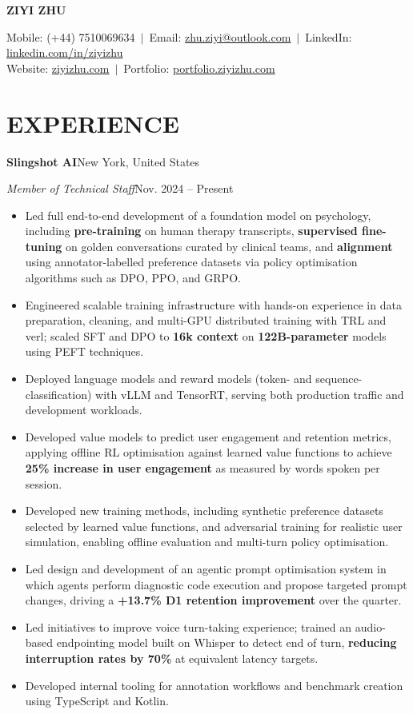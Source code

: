 \documentclass[10pt,a4paper]{article}
\newcommand{\name}[1]{\begin{center}\textbf{\Large #1}\end{center}}
\newcommand{\contactinfo}[4]{
    \begin{center}
    Mobile: #1 $\,\vert\,$ Email: \href{mailto:#2}{#2} $\,\vert\,$ LinkedIn: \href{https://#3}{#3}\\\vspace{1pt}
    Website: \href{https://#4}{#4} $\,\vert\,$ Portfolio: \href{https://portfolio.ziyizhu.com/}{portfolio.ziyizhu.com}
    \end{center}
}
\newcommand{\experience}[4]{%
    \textbf{#1}\hfill #2\par\vspace{-0.5\baselineskip}%
    \textit{#3}\hfill #4\par\vspace{-0.5\baselineskip}%
}
\begin{document}
\name{ZIYI ZHU}
\contactinfo{(+44) 7510069634}{zhu.ziyi@outlook.com}{linkedin.com/in/ziyizhu}{ziyizhu.com}

\section{EXPERIENCE}
\experience{Slingshot AI}{New York, United States}
{Member of Technical Staff}{Nov. 2024 -- Present}
\begin{itemize}
    \item Led full end-to-end development of a foundation model on psychology, including \textbf{pre-training} on human therapy transcripts, \textbf{supervised fine-tuning} on golden conversations curated by clinical teams, and \textbf{alignment} using annotator-labelled preference datasets via policy optimisation algorithms such as DPO, PPO, and GRPO.
    \item Engineered scalable training infrastructure with hands-on experience in data preparation, cleaning, and multi-GPU distributed training with TRL and verl; scaled SFT and DPO to \textbf{16k context} on \textbf{122B-parameter} models using PEFT techniques.
    \item Deployed language models and reward models (token- and sequence-classification) with vLLM and TensorRT, serving both production traffic and development workloads.
    \item Developed value models to predict user engagement and retention metrics, applying offline RL optimisation against learned value functions to achieve \textbf{25\% increase in user engagement} as measured by words spoken per session.
    \item Developed new training methods, including synthetic preference datasets selected by learned value functions, and adversarial training for realistic user simulation, enabling offline evaluation and multi-turn policy optimisation.
    \item Led design and development of an agentic prompt optimisation system in which agents perform diagnostic code execution and propose targeted prompt changes, driving a \textbf{+13.7\% D1 retention improvement} over the quarter.
    \item Led initiatives to improve voice turn-taking experience; trained an audio-based endpointing model built on Whisper to detect end of turn, \textbf{reducing interruption rates by 70\%} at equivalent latency targets.
    \item Developed internal tooling for annotation workflows and benchmark creation using TypeScript and Kotlin.
\end{itemize}
\end{document}
